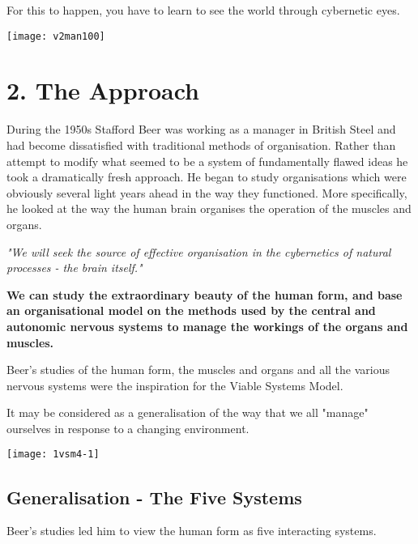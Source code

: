 For this to happen, you have to learn to see the world through cybernetic eyes.

\begin{center}
\texttt{[image: v2man100]}
\end{center}

\section*{2. The Approach}
During the 1950s Stafford Beer was working as a manager in British Steel and had become dissatisfied with traditional methods of organisation. Rather than attempt to modify what seemed to be a system of fundamentally flawed ideas he took a dramatically fresh approach. He began to study organisations which were obviously several light years ahead in the way they functioned. More specifically, he looked at the way the human brain organises the operation of the muscles and organs.

\textit{"We will seek the source of effective organisation in the cybernetics of natural processes - the brain itself."}

\textbf{We can study the extraordinary beauty of the human form, and base an organisational model on the methods used by the central and autonomic nervous systems to manage the workings of the organs and muscles.}

Beer's studies of the human form, the muscles and organs and all the various nervous systems were the inspiration for the Viable Systems Model.

It may be considered as a generalisation of the way that we all "manage" ourselves in response to a changing environment.

\begin{center}
\texttt{[image: 1vsm4-1]}
\end{center}

\subsection*{Generalisation - The Five Systems}
Beer's studies led him to view the human form as five interacting systems.

